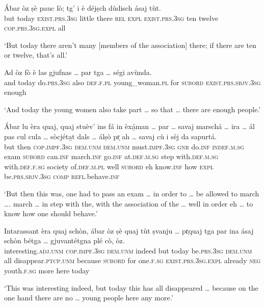 \begin{linenumbers}
	\gll    Ábar òz ṣè pauc lò; tg’ i è déjṣch dùdisch ásaj tùt.\\
	but today \textsc{exist.prs.3sg} little there \textsc{rel} \textsc{expl} \textsc{exist.prs.3sg} ten twelve \textsc{cop.prs.3sg.expl} all\\
\end{linenumbers}
\medskip
\glt `But today there aren’t many [members of the association] there; if there are ten or twelve, that’s all.'
\medskip

\begin{linenumbers}
	\gll    Ad òz fò è las gjufnas … par tga … ségi avùnda.\\
	and today do.\textsc{prs.3sg} also  \textsc{def.f.pl} young\_woman.\textsc{pl} {} for \textsc{subord} {} \textsc{exist.prs.sbjv.3sg} enough\\
\end{linenumbers}
\medskip
\glt `And today the young women also take part … so that … there are enough people.'
\medskip

\begin{linenumbers}
	\gll    Ábar lu èra quaj, quaj stuèv’ ins fá in èxá̱man … par … savaj marschá … ira … ál pas cul cula … sòcjéta̱t dals … álṣò pr̩ ah … savaj cù i sèj da sapurtá.\\
	but then \textsc{cop.impf.3sg} \textsc{dem.unm} \textsc{dem.unm} must.\textsc{impf.3sg} \textsc{gnr} do.\textsc{inf} \textsc{indef.m.sg} exam {} \textsc{subord} {} can.\textsc{inf} march.\textsc{inf} {} go.\textsc{inf} {} at.\textsc{def.m.sg} step with.\textsc{def.m.sg} with.\textsc{def.f.sg} {} society  of.\textsc{def.m.pl} {} well \textsc{subord} eh {} know.\textsc{inf} how \textsc{expl} be.\textsc{prs.sbjv.3sg} \textsc{comp} \textsc{refl.}behave.\textsc{inf}\\
\end{linenumbers}
\medskip
\glt `But then this was, one had to pass an exam … in order to … be allowed to march …. march … in step with the, with the association of the … well in order eh … to know how one should behave.'
\medskip

\begin{linenumbers}
	\gll    Intarassant èra quaj schòn, ábar òz ṣè quaj tùt ṣvanju … pr̩quaj tga par ina ásaj schòn bétga … gjuvantétgna plé cò, òz.\\
	interesting.\textsc{adj.unm} \textsc{cop.impf.3sg} \textsc{dem.unm} indeed but today be.\textsc{prs.3sg} \textsc{dem.unm} all disappear.\textsc{ptcp.unm} {} because \textsc{subord} for one.\textsc{f.sg} \textsc{exist.prs.3sg.expl} already \textsc{neg} {} youth.\textsc{f.sg} more here today \\
\end{linenumbers}
\medskip
\glt `This was interesting indeed, but today this has all disappeared … because on the one hand there are no … young people here any more.'
\medskip

